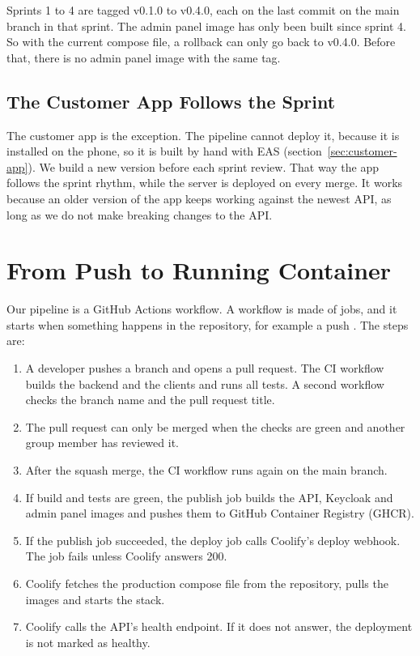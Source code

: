 \documentclass[a4paper,11pt]{article}
\begin{document}
Sprints 1 to 4 are tagged v0.1.0 to v0.4.0, each on the last commit on the main branch in that sprint. The admin panel image has only been built since sprint 4. So with the current compose file, a rollback can only go back to v0.4.0. Before that, there is no admin panel image with the same tag.

\subsection{The Customer App Follows the Sprint}
The customer app is the exception. The pipeline cannot deploy it, because it is installed on the phone, so it is built by hand with EAS (section~\ref{sec:customer-app}). We build a new version before each sprint review. That way the app follows the sprint rhythm, while the server is deployed on every merge. It works because an older version of the app keeps working against the newest API, as long as we do not make breaking changes to the API.

\section{From Push to Running Container}\label{sec:pipeline}
Our pipeline is a GitHub Actions workflow. A workflow is made of jobs, and it starts when something happens in the repository, for example a push \cite{github-understanding-actions}. The steps are:

\begin{enumerate}
    \item A developer pushes a branch and opens a pull request. The CI workflow builds the backend and the clients and runs all tests. A second workflow checks the branch name and the pull request title.
    \item The pull request can only be merged when the checks are green and another group member has reviewed it.
    \item After the squash merge, the CI workflow runs again on the main branch.
    \item If build and tests are green, the publish job builds the API, Keycloak and admin panel images and pushes them to GitHub Container Registry (GHCR).
    \item If the publish job succeeded, the deploy job calls Coolify's deploy webhook. The job fails unless Coolify answers 200.
    \item Coolify fetches the production compose file from the repository, pulls the images and starts the stack.
    \item Coolify calls the API's health endpoint. If it does not answer, the deployment is not marked as healthy.
\end{enumerate}
\end{document}
